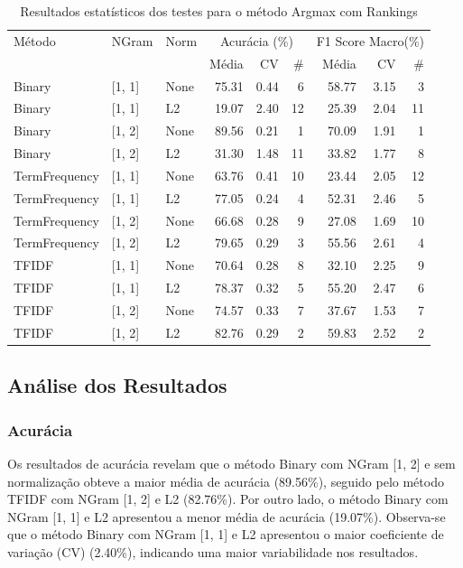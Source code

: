 \begin{table}[H]
\centering
\caption{Resultados estatísticos dos testes para o método Argmax com Rankings}
\label{tab:resultadoargmax_rankings}
\footnotesize %
\begin{tabular}{lllrrrrrr}
\hline
Método & NGram & Norm & \multicolumn{3}{c}{Acurácia (\%)} & \multicolumn{3}{c}{F1 Score Macro(\%)} \\
& & & Média & CV & \# & Média & CV & \# \\
\hline
Binary & [1, 1] & None & 75.31 & 0.44 & 6 & 58.77 & 3.15 & 3 \\
Binary & [1, 1] & L2 & 19.07 & 2.40 & 12 & 25.39 & 2.04 & 11 \\
Binary & [1, 2] & None & 89.56 & 0.21 & 1 & 70.09 & 1.91 & 1 \\
Binary & [1, 2] & L2 & 31.30 & 1.48 & 11 & 33.82 & 1.77 & 8 \\
TermFrequency & [1, 1] & None & 63.76 & 0.41 & 10 & 23.44 & 2.05 & 12 \\
TermFrequency & [1, 1] & L2 & 77.05 & 0.24 & 4 & 52.31 & 2.46 & 5 \\
TermFrequency & [1, 2] & None & 66.68 & 0.28 & 9 & 27.08 & 1.69 & 10 \\
TermFrequency & [1, 2] & L2 & 79.65 & 0.29 & 3 & 55.56 & 2.61 & 4 \\
TFIDF & [1, 1] & None & 70.64 & 0.28 & 8 & 32.10 & 2.25 & 9 \\
TFIDF & [1, 1] & L2 & 78.37 & 0.32 & 5 & 55.20 & 2.47 & 6 \\
TFIDF & [1, 2] & None & 74.57 & 0.33 & 7 & 37.67 & 1.53 & 7 \\
TFIDF & [1, 2] & L2 & 82.76 & 0.29 & 2 & 59.83 & 2.52 & 2 \\
\hline
\end{tabular}
\end{table}

\subsection{Análise dos Resultados}

\subsubsection{Acurácia}

Os resultados de acurácia revelam que o método Binary com NGram [1, 2] e sem normalização obteve a maior média de acurácia (89.56\%), seguido pelo método TFIDF com NGram [1, 2] e L2 (82.76\%). Por outro lado, o método Binary com NGram [1, 1] e L2 apresentou a menor média de acurácia (19.07\%). Observa-se que o método Binary com NGram [1, 1] e L2 apresentou o maior coeficiente de variação (CV) (2.40\%), indicando uma maior variabilidade nos resultados.

